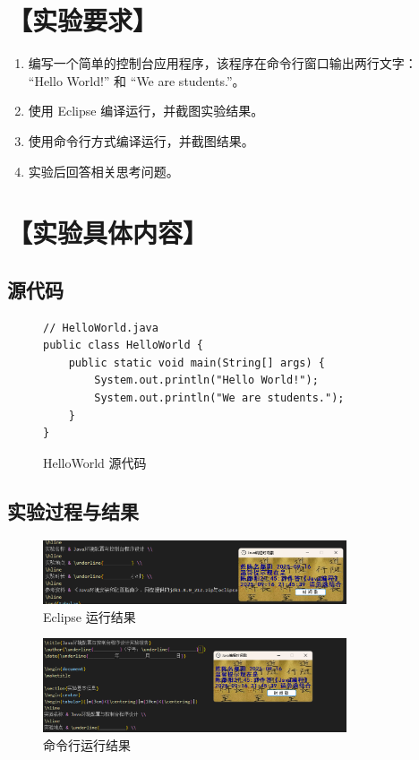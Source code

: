 \documentclass[12pt,a4paper]{article}
\begin{document}
\section*{【实验要求】}
\begin{enumerate}
    \item 编写一个简单的控制台应用程序，该程序在命令行窗口输出两行文字：\\
    “Hello World!” 和 “We are students.”。
    \item 使用 Eclipse 编译运行，并截图实验结果。
    \item 使用命令行方式编译运行，并截图结果。
    \item 实验后回答相关思考问题。
\end{enumerate}

\section*{【实验具体内容】}

\subsection*{源代码}
\begin{figure}[H]
\centering
\begin{lstlisting}
// HelloWorld.java
public class HelloWorld {
    public static void main(String[] args) {
        System.out.println("Hello World!");
        System.out.println("We are students.");
    }
}
\end{lstlisting}
\caption{HelloWorld 源代码}
\end{figure}

\subsection*{实验过程与结果}

\begin{figure}[H]
\centering
\includegraphics[width=0.8\textwidth]{eclipse_result.png}
\caption{Eclipse 运行结果}
\end{figure}

\begin{figure}[H]
\centering
\includegraphics[width=0.8\textwidth]{cmd_result.png}
\caption{命令行运行结果}
\end{figure}
\end{document}
